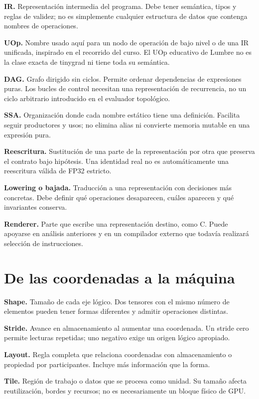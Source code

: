 \documentclass[12pt,a4paper,oneside]{report}
\begin{document}
\textbf{IR.} Representación intermedia del programa. Debe tener semántica, tipos y reglas de validez; no es simplemente cualquier estructura de datos que contenga nombres de operaciones.

\textbf{UOp.} Nombre usado aquí para un nodo de operación de bajo nivel o de una IR unificada, inspirado en el recorrido del curso. El UOp educativo de Lumbre no es la clase exacta de tinygrad ni tiene toda su semántica.

\textbf{DAG.} Grafo dirigido sin ciclos. Permite ordenar dependencias de expresiones puras. Los bucles de control necesitan una representación de recurrencia, no un ciclo arbitrario introducido en el evaluador topológico.

\textbf{SSA.} Organización donde cada nombre estático tiene una definición. Facilita seguir productores y usos; no elimina alias ni convierte memoria mutable en una expresión pura.

\textbf{Reescritura.} Sustitución de una parte de la representación por otra que preserva el contrato bajo hipótesis. Una identidad real no es automáticamente una reescritura válida de FP32 estricto.

\textbf{Lowering o bajada.} Traducción a una representación con decisiones más concretas. Debe definir qué operaciones desaparecen, cuáles aparecen y qué invariantes conserva.

\textbf{Renderer.} Parte que escribe una representación destino, como C. Puede apoyarse en análisis anteriores y en un compilador externo que todavía realizará selección de instrucciones.

\section{De las coordenadas a la máquina}
\textbf{Shape.} Tamaño de cada eje lógico. Dos tensores con el mismo número de elementos pueden tener formas diferentes y admitir operaciones distintas.

\textbf{Stride.} Avance en almacenamiento al aumentar una coordenada. Un stride cero permite lecturas repetidas; uno negativo exige un origen lógico apropiado.

\textbf{Layout.} Regla completa que relaciona coordenadas con almacenamiento o propiedad por participantes. Incluye más información que la forma.

\textbf{Tile.} Región de trabajo o datos que se procesa como unidad. Su tamaño afecta reutilización, bordes y recursos; no es necesariamente un bloque físico de GPU.
\end{document}
